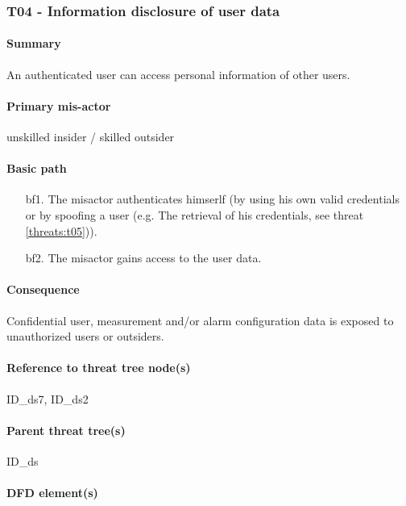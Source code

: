 \subsubsection{T04 - Information disclosure of user data}

\paragraph{Summary}

\npar An authenticated user can access personal information of other users.

\paragraph{Primary mis-actor}

\npar unskilled insider / skilled outsider

\paragraph{Basic path}

\begin{enumerate}
	\item[bf1.] The misactor authenticates himserlf (by using his own valid
	credentials or by spoofing a user (e.g. The retrieval of his credentials, see
	threat \ref{threats:t05})).
    \item[bf2.] The misactor gains access to the user data.
\end{enumerate}

\paragraph{Consequence}

\npar Confidential user, measurement and/or alarm configuration data is exposed
to unauthorized users or outsiders.

\paragraph{Reference to threat tree node(s)}

ID\_ds7, ID\_ds2

\paragraph{Parent threat tree(s)}

ID\_ds

\paragraph{DFD element(s)}

